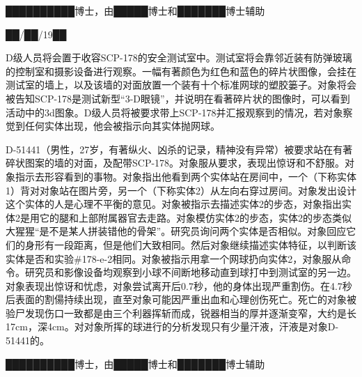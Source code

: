 
\hr


██████████博士，由█████博士和███████博士辅助

██\slash ██\slash 19██

D级人员将会置于收容SCP-178的安全测试室中。测试室将会靠邻近装有防弹玻璃的控制室和摄影设备进行观察。一幅有著颜色为红色和蓝色的碎片状图像，会挂在测试室的墙上，以及该墙的对面放置一个装有十个标准网球的塑胶篓子。对象将会被告知SCP-178是测试新型“3-D眼镜”，并说明在看著碎片状的图像时，可以看到活动中的3d图象。D级人员将被要求带上SCP-178并汇报观察到的情况，若对象察觉到任何实体出现，他会被指示向其实体抛网球。

D-51441（男性，27岁，有著纵火、凶杀的记录，精神没有异常）被要求站在有著碎状图案的墙的对面，及配带SCP-178。对象服从要求，表现出惊讶和不舒服。对象指示去形容看到的事物。对象指出他看到两个实体站在房间中，一个（下称实体1）背对对象站在图片旁，另一个（下称实体2）从左向右穿过房间。对象发出设计这个实体的人是心理不平衡的意见。对象被指示去描述实体2的步态，对象指出实体2是用它的腿和上部附属器官去走路。对象模仿实体2的步态，实体2的步态类似大猩猩“是不是某人拼装错他的骨架”。研究员询问两个实体是否相似。对象回应它们的身形有一段距离，但是他们大致相同。然后对象继续描述实体特征，以判断该实体是否和实验\#178-e-2相同。对象被指示用拿一个网球扔向实体2，对象服从命令。研究员和影像设备均观察到小球不间断地移动直到球打中到测试室的另一边。对象表现出惊讶和忧虑，对象尝试离开后0.7秒，他的身体出现严重割伤。在4.7秒后表面的割偒持续出现，直至对象可能因严重出血和心理创伤死亡。死亡的对象被验尸发现伤口一致都是由三个利器挥斩而成，锐器相当的厚并逐渐变窄，大约是长17cm，深4cm。对对象所挥的球进行的分析发现只有少量汗液，汗液是对象D-51441的。


\hr


██████████博士，由█████博士和███████博士辅助

